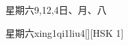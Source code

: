 \begin{entry}{星期六}{9,12,4}{⽇、⽉、⼋}
  \begin{phonetics}{星期六}{xing1qi1liu4}[][HSK 1]
  \end{phonetics}
\end{entry}
